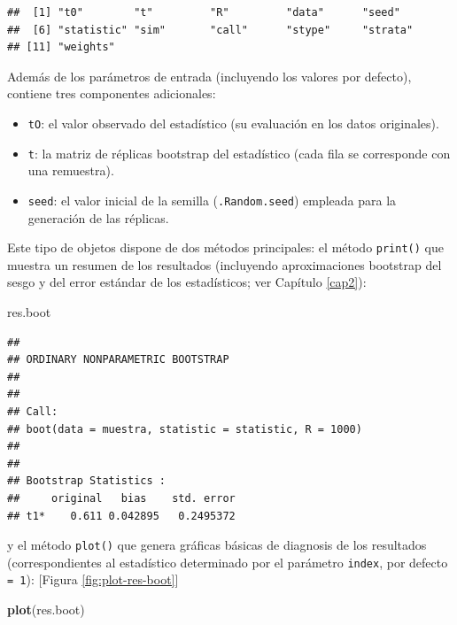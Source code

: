\documentclass[]{book}
\newenvironment{Shaded}{\begin{snugshade}}{\end{snugshade}}
\newcommand{\KeywordTok}[1]{\textcolor[rgb]{0.13,0.29,0.53}{\textbf{#1}}}
\newcommand{\NormalTok}[1]{#1}
\theoremstyle{definition}
\theoremstyle{definition}
\theoremstyle{definition}
\theoremstyle{remark}
\begin{document}
\begin{verbatim}
##  [1] "t0"        "t"         "R"         "data"      "seed"     
##  [6] "statistic" "sim"       "call"      "stype"     "strata"   
## [11] "weights"
\end{verbatim}

Además de los parámetros de entrada (incluyendo los valores por
defecto), contiene tres componentes adicionales:

\begin{itemize}
\item
  \texttt{tO}: el valor observado del estadístico (su evaluación en los
  datos originales).
\item
  \texttt{t}: la matriz de réplicas bootstrap del estadístico (cada fila
  se corresponde con una remuestra).
\item
  \texttt{seed}: el valor inicial de la semilla (\texttt{.Random.seed})
  empleada para la generación de las réplicas.
\end{itemize}

Este tipo de objetos dispone de dos métodos principales: el método
\texttt{print()} que muestra un resumen de los resultados (incluyendo
aproximaciones bootstrap del sesgo y del error estándar de los
estadísticos; ver Capítulo \ref{cap2}):

\begin{Shaded}
\begin{Highlighting}[]
\NormalTok{res.boot}
\end{Highlighting}
\end{Shaded}

\begin{verbatim}
## 
## ORDINARY NONPARAMETRIC BOOTSTRAP
## 
## 
## Call:
## boot(data = muestra, statistic = statistic, R = 1000)
## 
## 
## Bootstrap Statistics :
##     original   bias    std. error
## t1*    0.611 0.042895   0.2495372
\end{verbatim}

y el método \texttt{plot()} que genera gráficas básicas de diagnosis de
los resultados (correspondientes al estadístico determinado por el
parámetro \texttt{index}, por defecto \texttt{=\ 1}): {[}Figura
\ref{fig:plot-res-boot}{]}

\begin{Shaded}
\begin{Highlighting}[]
\KeywordTok{plot}\NormalTok{(res.boot)}
\end{Highlighting}
\end{Shaded}
\end{document}
